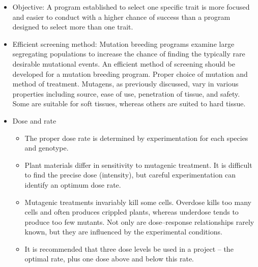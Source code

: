 \documentclass[11pt,ignorenonframetext,aspectratio=169]{beamer}
\providecommand{\tightlist}{%
  \setlength{\itemsep}{0pt}\setlength{\parskip}{0pt}}
\begin{document}
\begin{frame}{}
\protect\hypertarget{section-5}{}
\small

\begin{itemize}
\tightlist
\item
  Objective: A program established to select one specific trait is more
  focused and easier to conduct with a higher chance of success than a
  program designed to select more than one trait.
\item
  Efficient screening method: Mutation breeding programs examine large
  segregating populations to increase the chance of finding the
  typically rare desirable mutational events. An efficient method of
  screening should be developed for a mutation breeding program. Proper
  choice of mutation and method of treatment. Mutagens, as previously
  discussed, vary in various properties including source, ease of use,
  penetration of tissue, and safety. Some are suitable for soft tissues,
  whereas others are suited to hard tissue.
\item
  Dose and rate

  \begin{itemize}
  \footnotesize
  \item The proper dose rate is determined by experimentation for each species and genotype. 
  \item Plant materials differ in sensitivity to mutagenic treatment. It is difficult to find the precise dose (intensity), but careful experimentation can identify an optimum dose rate. 
  \item Mutagenic treatments invariably kill some cells. Overdose kills too many cells and often produces crippled plants, whereas underdose tends to produce too few mutants. Not only are dose–response relationships rarely known, but they are influenced by the experimental conditions. 
  \item It is recommended that three dose levels be used in a project – the optimal rate, plus one dose above and below this rate.
  \end{itemize}
\end{itemize}
\end{frame}
\end{document}
